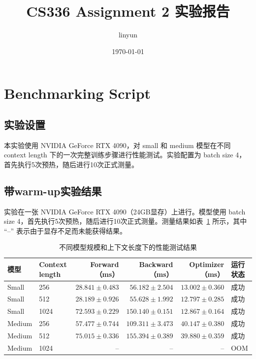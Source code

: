 \documentclass[12pt]{ctexart}
\title{CS336 Assignment 2 实验报告}
\author{linyun}
\date{\today}
\begin{document}
\maketitle

\section{Benchmarking Script}

\subsection{实验设置}

本实验使用 NVIDIA GeForce RTX 4090，对 small 和 medium 模型在不同 context length 下的一次完整训练步骤进行性能测试。实验配置为 batch size 4，首先执行5次预热，随后进行10次正式测量。

\subsection{带warm-up实验结果}

实验在一张 NVIDIA GeForce RTX 4090（24GB显存）上进行。模型使用 batch size 4，首先执行5次预热，随后进行10次正式测量。测量结果如表~\ref{tab:benchmark-results} 所示，其中 ``--'' 表示由于显存不足而未能获得结果。

\begin{table}[htbp]
    \centering
    \caption{不同模型规模和上下文长度下的性能测试结果}
    \label{tab:benchmark-results}
    \begin{tabular}{llrrrl}
        \toprule
        模型 &
        Context length &
        Forward（ms） &
        Backward（ms） &
        Optimizer（ms） &
        运行状态 \\
        \midrule
        Small & 256
        & $28.841 \pm 0.483$
        & $56.182 \pm 2.504$
        & $13.002 \pm 0.360$
        & 成功 \\

        Small & 512
        & $28.189 \pm 0.926$
        & $55.628 \pm 1.992$
        & $12.797 \pm 0.285$
        & 成功 \\

        Small & 1024
        & $72.593 \pm 0.229$
        & $150.140 \pm 0.151$
        & $12.867 \pm 0.164$
        & 成功 \\

        Medium & 256
        & $57.477 \pm 0.744$
        & $109.311 \pm 3.473$
        & $40.147 \pm 0.380$
        & 成功 \\

        Medium & 512
        & $75.015 \pm 0.336$
        & $155.394 \pm 0.389$
        & $39.880 \pm 0.359$
        & 成功 \\

        Medium & 1024
        & --
        & --
        & --
        & OOM \\
        \bottomrule
    \end{tabular}
\end{table}
\end{document}
